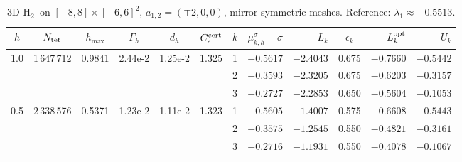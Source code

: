 \begin{table}[htbp]
\caption{3D $\mathrm{H}_2^+$ on $[-8,8]\times[-6,6]^2$, $a_{1,2}=(\mp2,0,0)$, mirror-symmetric meshes. Reference: $\lambda_1\approx-0.5513$.}
\label{tab:twocenter-3d-cecr}
\centering\footnotesize
\setlength{\tabcolsep}{2.5pt}
\begin{tabular}{cccccc|crrcrr}
\toprule
$h$ & $N_{\rm tet}$ & $h_{\max}$ & $\Gamma_h$ & $d_h$ & $C_\epsilon^{\rm cert}$ & $k$ & $\mu_{k,h}^\sigma{-}\sigma$ & $L_k$ & $\epsilon_k$ & $L_k^{\rm opt}$ & $U_k$ \\
\midrule
\multirow{3}{*}{1.0} & \multirow{3}{*}{1\,647\,712} & \multirow{3}{*}{0.9841} & \multirow{3}{*}{2.44e-2} & \multirow{3}{*}{1.25e-2} & \multirow{3}{*}{1.325} & 1 & $-0.5617$ & $-2.4043$ & 0.675 & $-0.7660$ & $-0.5442$ \\
 & & & & & & 2 & $-0.3593$ & $-2.3205$ & 0.675 & $-0.6203$ & $-0.3157$ \\
 & & & & & & 3 & $-0.2727$ & $-2.2853$ & 0.650 & $-0.5604$ & $-0.1053$ \\
\midrule
\multirow{3}{*}{0.5} & \multirow{3}{*}{2\,338\,576} & \multirow{3}{*}{0.5371} & \multirow{3}{*}{1.23e-2} & \multirow{3}{*}{1.11e-2} & \multirow{3}{*}{1.323} & 1 & $-0.5605$ & $-1.4007$ & 0.575 & $-0.6608$ & $-0.5443$ \\
 & & & & & & 2 & $-0.3575$ & $-1.2545$ & 0.550 & $-0.4821$ & $-0.3161$ \\
 & & & & & & 3 & $-0.2716$ & $-1.1931$ & 0.550 & $-0.4078$ & $-0.1067$ \\
\bottomrule
\end{tabular}
\end{table}
